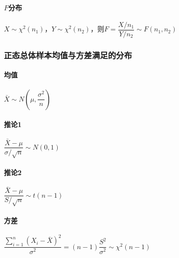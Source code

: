 \paragraph{$F$分布}

$X \sim \chi^{2} (n_{1})$，$Y \sim \chi^{2} (n_{2})$，则$F=\dfrac{X/n_{1}}{Y/n_{2}} \sim F \left( n_{1},n_{2} \right)$


\subsubsection{正态总体样本均值与方差满足的分布}
\label{sec:790103959290}
\paragraph{均值}
$\bar{X} \sim N \left( \mu, \dfrac{\sigma^{2}}{n} \right)$

\paragraph{推论1}
$\dfrac{\bar{X}-\mu}{\sigma / \sqrt{n}} \sim N(0,1)$

\paragraph{推论2}
$\dfrac{\bar{X}-\mu}{S / \sqrt{n}} \sim t(n-1)$

\paragraph{方差}
$\dfrac{\sum\limits_{i=1}^{n} \left( X_{i} - \bar{X} \right)^{2}}{\sigma^{2}} = (n-1) \dfrac{S^{2}}{\sigma^{2}} \sim \chi^{2} (n-1)$



